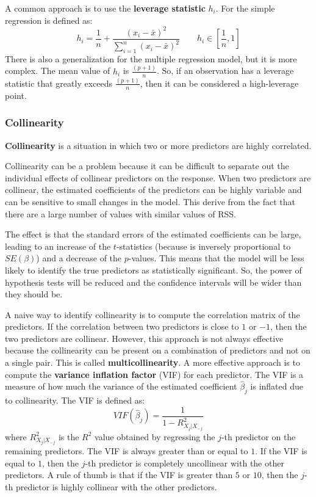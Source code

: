 A common approach is to use the \textbf{leverage statistic} $h_{i}$. For the simple regression is defined as:
\[
    h_{i} = \frac{1}{n} + \frac{(x_i - \bar{x})^2}{\sum_{i=1}^{n}(x_i - \bar{x})^2}\qquad h_i\in\left[\frac 1n, 1\right]
\]
There is also a generalization for the multiple regression model, but it is more complex.
The mean value of $h_i$ is $\frac{(p+1)}n$. So, if an observation has a leverage statistic that greatly exceeds $\frac{(p+1)}{n}$, then it can be considered a high-leverage point.
\subsubsection*{Collinearity}
\textbf{Collinearity} is a situation in which two or more predictors are highly correlated.

Collinearity can be a problem because it can be difficult to separate out the individual effects of collinear predictors on the response.
When two predictors are collinear, the estimated coefficients of the predictors can be highly variable and can be sensitive to small changes in the model. This derive from the fact that there are a large number of values with similar values of RSS.

The effect is that the standard errors of the estimated coefficients can be large, leading to an increase of the $t$-statistics (because is inversely proportional to $SE(\beta)$) and a decrease of the $p$-values. This means that the model will be less likely to identify the true predictors as statistically significant.
So, the power of hypothesis tests will be reduced and the confidence intervals will be wider than they should be.

A naive way to identify collinearity is to compute the correlation matrix of the predictors. If the correlation between two predictors is close to $1$ or $-1$, then the two predictors are collinear. However, this approach is not always effective because the collinearity can be present on a combination of predictors and not on a single pair. This is called \textbf{multicollinearity}.
A more effective approach is to compute the \textbf{variance inflation factor} (VIF) for each predictor. The VIF is a measure of how much the variance of the estimated coefficient $\hat{\beta}_j$ is inflated due to collinearity. The VIF is defined as:
\[
    VIF(\hat{\beta}_j) = \frac{1}{1-R^2_{X_j|X_{-j}}}
\]
where $R^2_{X_j|X_{-j}}$ is the $R^2$ value obtained by regressing the $j$-th predictor on the remaining predictors. The VIF is always greater than or equal to $1$. If the VIF is equal to $1$, then the $j$-th predictor is completely uncollinear with the other predictors. 
A rule of thumb is that if the VIF is greater than $5$ or $10$, then the $j$-th predictor is highly collinear with the other predictors.

